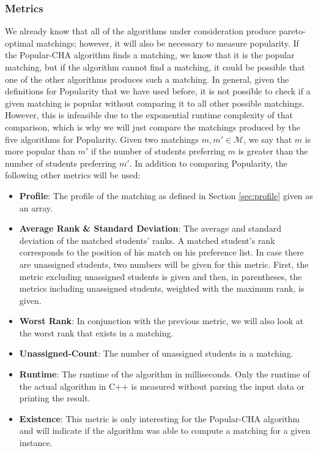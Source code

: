 \subsubsection{Metrics}
We already know that all of the algorithms under consideration produce pareto-optimal matchings; however, it will also be necessary to measure popularity. If the Popular-CHA algorithm finds a matching, we know that it is the popular matching, but if the algorithm cannot find a matching, it could be possible that one of the other algorithms produces such a matching. In general, given the definitions for Popularity that we have used before, it is not possible to check if a given matching is popular without comparing it to all other possible matchings. However, this is infeasible due to the exponential runtime complexity of that comparison, which is why we will just compare the matchings produced by the five algorithms for Popularity. Given two matchings $m, m' \in \mathcal{M}$, we say that $m$ is more popular than $m'$ if the number of students preferring $m$ is greater than the number of students preferring $m'$. 
In addition to comparing Popularity, the following other metrics will be used:
\begin{itemize}
  \item \textbf{Profile}: The profile of the matching as defined in Section \ref{sec:profile} given as an array.
  \item \textbf{Average Rank \& Standard Deviation}: The average and standard deviation of the matched students' ranks. A matched student's rank corresponds to the position of his match on his preference list. In case there are unassigned students, two numbers will be given for this metric. First, the metric excluding unassigned students is given and then, in parentheses, the metrics including unassigned students, weighted with the maximum rank, is given.
  \item \textbf{Worst Rank}: In conjunction with the previous metric, we will also look at the worst rank that exists in a matching.
  \item \textbf{Unassigned-Count}: The number of unassigned students in a matching.
  \item \textbf{Runtime}: The runtime of the algorithm in milliseconds. Only the runtime of the actual algorithm in C++ is measured without parsing the input data or printing the result.
  \item \textbf{Existence}: This metric is only interesting for the Popular-CHA algorithm and will indicate if the algorithm was able to compute a matching for a given instance.
\end{itemize}

